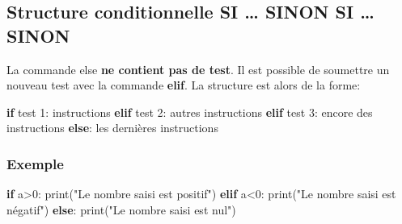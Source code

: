 \documentclass[11pt]{article}
\newenvironment{Shaded}{}{}
\newcommand{\DecValTok}[1]{\textcolor[rgb]{0.25,0.63,0.44}{{#1}}}
\newcommand{\StringTok}[1]{\textcolor[rgb]{0.25,0.44,0.63}{{#1}}}
\newcommand{\NormalTok}[1]{{#1}}
\newcommand{\ControlFlowTok}[1]{\textcolor[rgb]{0.00,0.44,0.13}{\textbf{{#1}}}}
\newcommand{\OperatorTok}[1]{\textcolor[rgb]{0.40,0.40,0.40}{{#1}}}
\newcommand{\BuiltInTok}[1]{{#1}}
\begin{document}
\hypertarget{structure-conditionnelle-si-sinon-si-sinon}{%
\subsection{Structure conditionnelle SI \ldots{} SINON SI \ldots{}
SINON}\label{structure-conditionnelle-si-sinon-si-sinon}}

La commande else \textbf{ne contient pas de test}. Il est possible de
soumettre un nouveau test avec la commande \textbf{elif}. La structure
est alors de la forme:

\begin{Shaded}
\begin{Highlighting}[]
\ControlFlowTok{if}\NormalTok{ test }\DecValTok{1}\NormalTok{:}
\NormalTok{    instructions}
\ControlFlowTok{elif}\NormalTok{ test }\DecValTok{2}\NormalTok{:}
\NormalTok{    autres instructions}
\ControlFlowTok{elif}\NormalTok{ test }\DecValTok{3}\NormalTok{:}
\NormalTok{    encore des instructions}
\ControlFlowTok{else}\NormalTok{:}
\NormalTok{    les dernières instructions}
\end{Highlighting}
\end{Shaded}

\hypertarget{exemple-3}{%
\subsubsection*{Exemple}\label{exemple-3}}

\begin{Shaded}
\begin{Highlighting}[]
\ControlFlowTok{if}\NormalTok{ a}\OperatorTok{\textgreater{}}\DecValTok{0}\NormalTok{:}
    \BuiltInTok{print}\NormalTok{(}\StringTok{"Le nombre saisi est positif"}\NormalTok{)}
\ControlFlowTok{elif}\NormalTok{ a}\OperatorTok{\textless{}}\DecValTok{0}\NormalTok{:}
    \BuiltInTok{print}\NormalTok{(}\StringTok{"Le nombre saisi est négatif"}\NormalTok{)}
\ControlFlowTok{else}\NormalTok{:}
    \BuiltInTok{print}\NormalTok{(}\StringTok{"Le nombre saisi est nul"}\NormalTok{)}
\end{Highlighting}
\end{Shaded}

    
\end{document}

